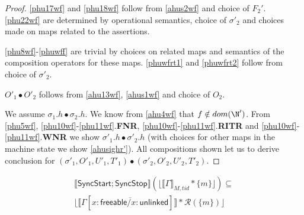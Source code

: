 \begin{proof}
\ref{phu17wf} and \ref{phu18wf} follow from \ref{ahus2wf} and choice of $F_2'$.  \ref{phu22wf} are determined by operational semantics, choice of $\sigma'_2$ and choices made on maps related to the assertions.

\ref{phu8wf}-\ref{phuwff} are trivial by choices on related maps and semantics of the composition operators for these maps. \ref{phuwfrt1} and \ref{phuwfrt2} follow from choice of $\sigma'_2$.

$O'_1 \bullet O'_2 $ follows from \ref{ahu13wf}, \ref{ahus1wf} and choice of $O_2$. 

We assume $\sigma_1.h \bullet \sigma_2.h$. We know from \ref{ahu4wf} that $f \notin dom(\N')$. From \ref{phu5wf}, \ref{phu10wf}-\ref{phu11wf}.\textbf{FNR}, \ref{phu10wf}-\ref{phu11wf}.\textbf{RITR} and \ref{phu10wf}-\ref{phu11wf}.\textbf{WNR} we show $\sigma'_1.h \bullet \sigma'_2.h$ (with choices for other maps in the machine state we show \ref{ahusighr'}). All compositions shown  let us to derive conclusion for $(\sigma'_1, O'_1, U'_1, T'_1) \bullet (\sigma'_2, O'_2, U'_2, T'_2) $.
 \end{proof}
\begin{lemma}
   \label{lemma:syncstop}
   \begin{align*}
  \llbracket  \textsf{SyncStart};\textsf{SyncStop} \rrbracket (\lfloor \llbracket \Gamma  \rrbracket_{M,tid} * \{m\}\rfloor)  \subseteq \\
                                                              \lfloor \llbracket \Gamma[\overline{x:\textsf{freeable}/x:\textsf{unlinked}}] \rrbracket  * \mathcal{R}(\{m\})\rfloor
\end{align*}
 \end{lemma}
